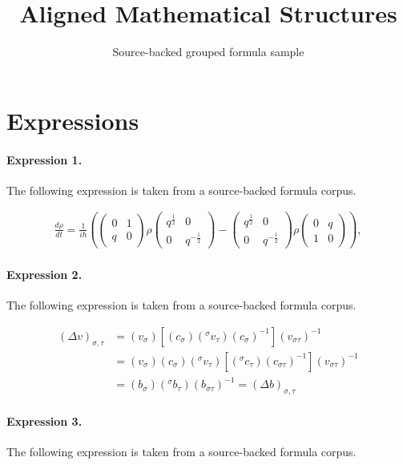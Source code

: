 \documentclass[11pt]{article}
\title{Aligned Mathematical Structures}
\author{Source-backed grouped formula sample}
\date{}
\begin{document}
\maketitle
\section{Expressions}
\paragraph{Expression 1.} The following expression is taken from a source-backed formula corpus.

\begin{align*}\frac {d \rho }{d t} = \frac {1}{i \hbar }\left(\left(\begin{array}{cc}0&1\\q&0\end{array}\right) \rho\left(\begin{array}{cc}q^{\frac {1}{2}}&0\\0&q^{-\frac{1}{2}}\end{array}\right) -\left(\begin{array}{cc}q^{\frac {1}{2}}&0\\0&q^{-\frac{1}{2}}\end{array}\right) \rho\left(\begin{array}{cc}0&q\\1&0\end{array}\right) \right),\end{align*}

\paragraph{Expression 2.} The following expression is taken from a source-backed formula corpus.

\begin{align*}(\Delta v)_{\sigma, \tau}&=(v_{\sigma})[(c_{\sigma}) ({}^{\sigma} v_{\tau}) (c_{\sigma})^{-1}](v_{\sigma \tau})^{-1}\\&=(v_{\sigma}) (c_{\sigma})({}^{\sigma} v_{\tau}) [({}^{\sigma}\! c_{\tau})(c_{\sigma \tau})^{-1}](v_{\sigma \tau})^{-1}\\&=(b_{\sigma})({}^{\sigma} b_{\tau})(b_{\sigma \tau})^{-1}=(\Delta b)_{\sigma, \tau} \end{align*}

\paragraph{Expression 3.} The following expression is taken from a source-backed formula corpus.
\end{document}

